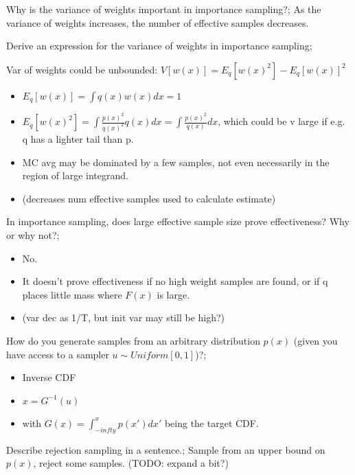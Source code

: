\documentclass{article}
\begin{document}
Why is the variance of weights important in importance sampling?; As the variance of weights increases, the number of effective samples decreases.

Derive an expression for the variance of weights in importance sampling; \item Var of weights could be unbounded: $V[w(x)] = E_q[w(x)^2] - E_q[w(x)]^2$ \begin{itemize} \item $E_q[w(x)] = \int q(x)w(x)dx = 1$ \item $E_q[w(x)^2] = \int \frac{p(x)^2}{q(x)^2}q(x)dx = \int \frac{p(x)^2}{q(x)}dx$, which could be v large if e.g. q has a lighter tail than p.  \item MC avg may be dominated by a few samples, not even necessarily in the region of large integrand. \item (decreases num effective samples used to calculate estimate) \end{itemize}

In importance sampling, does large effective sample size prove effectiveness? Why or why not?; \begin{itemize} \item No. \item It doesn't prove effectiveness if no high weight samples are found, or if q places little mass where $F(x)$ is large. \item (var dec as 1/T, but init var may still be high?) \end{itemize}

How do you generate samples from an arbitrary distribution $p(x)$ (given you have access to a sampler $u\sim Uniform[0,1]$)?; \begin{itemize} \item Inverse CDF \item $x = G^{-1}(u)$ \item with $G(x) = \int_{-infty}^x p(x')dx'$ being the target CDF. \end{itemize}

Describe rejection sampling in a sentence.; Sample from an upper bound on $p(x)$, reject some samples. (TODO: expand a bit?)
\end{document}
